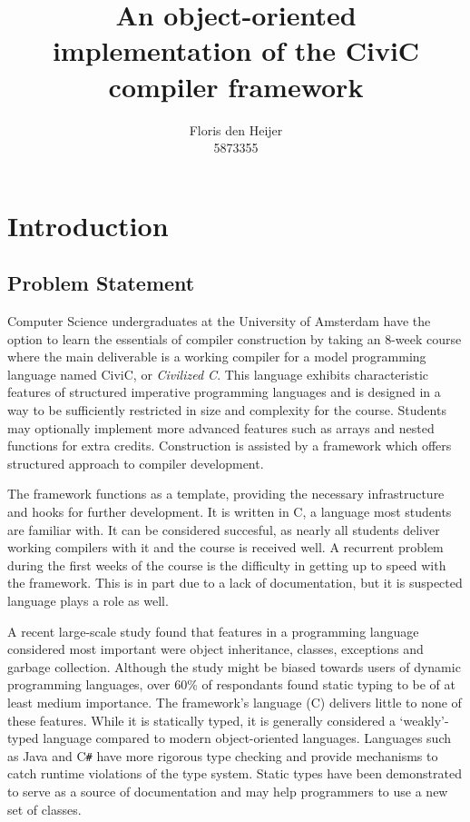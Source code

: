 \documentclass[twoside,openright]{uva-bachelor-thesis}
\title{An object-oriented \\implementation of the CiviC compiler framework}
\author{Floris den Heijer\\5873355}
\newcommand{\cs}{C\texttt{\#}\xspace}
\begin{document}
\maketitle
\begin{abstract}
	\lipsum
\end{abstract}

\tableofcontents


\chapter{Introduction}
	\section{Problem Statement}
		Computer Science undergraduates at the University of Amsterdam have the option to learn the essentials of compiler construction by taking an 8-week course where the main deliverable is a working compiler for a model programming language named CiviC, or \emph{Civilized C}. This language exhibits characteristic features of structured imperative programming languages and is designed in a way to be sufficiently restricted in size and complexity for the course. Students may optionally implement more advanced features such as arrays and nested functions for extra credits. Construction is assisted by a framework which offers structured approach to compiler development.
		
		The framework functions as a template, providing the necessary infrastructure and hooks for further development. It is written in C, a language most students are familiar with. It can be considered succesful, as nearly all students deliver working compilers with it and the course is received well. A recurrent problem during the first weeks of the course is the difficulty in getting up to speed with the framework. This is in part due to a lack of documentation, but it is suspected language plays a role as well. 
		
		A recent large-scale study found that features in a programming language considered most important were object inheritance, classes, exceptions and garbage collection\cite{Meyerovich2013}. Although the study might be biased towards users of dynamic programming languages, over 60\% of respondants found static typing to be of at least medium importance. The framework's language (C) delivers little to none of these features. While it is statically typed, it is generally considered a `weakly'-typed language compared to modern object-oriented languages. Languages such as Java and \cs have more rigorous type checking and provide mechanisms to catch runtime violations of the type system. Static types have been demonstrated to serve as a source of documentation and may help programmers to use a new set of classes\cite{Hanenberg2014}.
		
\end{document}
